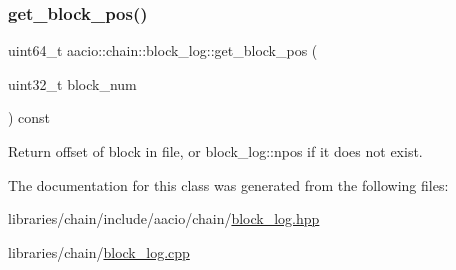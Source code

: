 \subsubsection{\texorpdfstring{get\+\_\+block\+\_\+pos()}{get\_block\_pos()}}
{\footnotesize\ttfamily uint64\+\_\+t aacio\+::chain\+::block\+\_\+log\+::get\+\_\+block\+\_\+pos (\begin{DoxyParamCaption}\item[{uint32\+\_\+t}]{block\+\_\+num }\end{DoxyParamCaption}) const}

Return offset of block in file, or block\+\_\+log\+::npos if it does not exist. 

The documentation for this class was generated from the following files\+:\begin{DoxyCompactItemize}
\item 
libraries/chain/include/aacio/chain/\mbox{\hyperlink{block__log_8hpp}{block\+\_\+log.\+hpp}}\item 
libraries/chain/\mbox{\hyperlink{block__log_8cpp}{block\+\_\+log.\+cpp}}\end{DoxyCompactItemize}
